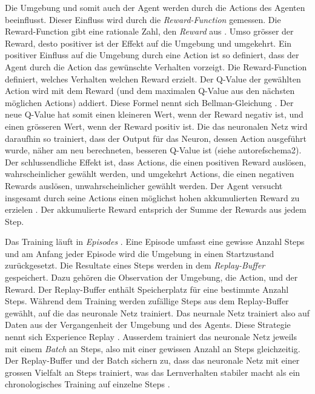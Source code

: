 Die Umgebung und somit auch der Agent werden durch die Actions des Agenten
beeinflusst. Dieser Einfluss wird durch die \emph{Reward-Function} gemessen. Die
Reward-Function gibt eine rationale Zahl, den \emph{Reward} aus \cite[S.
75]{sutton_reinforcement_2014}. Umso grösser der Reward, desto positiver ist der
Effekt auf die Umgebung und umgekehrt. Ein positiver Einfluss auf die Umgebung
durch eine Action ist so definiert, dass der Agent durch die Action das
gewünschte Verhalten vorzeigt. Die Reward-Function definiert, welches Verhalten
welchen Reward erzielt. Der Q-Value der gewählten Action wird mit dem Reward
(und dem maximalen Q-Value aus den nächsten möglichen Actions) addiert. Diese
Formel nennt sich Bellman-Gleichung \cite[S. 3]{mnih_playing_2013}. Der neue
Q-Value hat somit einen kleineren Wert, wenn der Reward negativ ist, und einen
grösseren Wert, wenn der Reward positiv ist. Die das neuronalen Netz wird
daraufhin so trainiert, dass der Output für das Neuron, dessen Action ausgeführt
wurde, näher am neu berechneten, besseren Q-Value ist (siehe autoref{schema2}).
Der schlussendliche Effekt ist, dass Actions, die einen positiven Reward
auslösen, wahrscheinlicher gewählt werden, und umgekehrt Actions, die einen
negativen Rewards auslösen, unwahrscheinlicher gewählt werden. Der Agent
versucht insgesamt durch seine Actions einen möglichst hohen akkumulierten
Reward zu erzielen \cite[S. 57]{sutton_reinforcement_2014}. Der akkumulierte
Reward entsprich der Summe der Rewards aus jedem Step.


Das Training läuft in \emph{Episodes} \cite[S. 14]{sutton_reinforcement_2014}. Eine Episode umfasst
eine gewisse Anzahl Steps und am Anfang jeder Episode wird die Umgebung in einen
Startzustand zurückgesetzt. Die Resultate eines Steps werden in dem
\emph{Replay-Buffer} gespeichert. Dazu gehören die Observation der Umgebung, die
Action, und der Reward. Der Replay-Buffer enthält Speicherplatz für eine
bestimmte Anzahl Steps. Während dem Training werden zufällige Steps aus dem
Replay-Buffer gewählt, auf die das neuronale Netz trainiert. Das neurnale Netz
trainiert also auf Daten aus der Vergangenheit der Umgebung und des Agents.
Diese Strategie nennt sich Experience Replay \cite[S. 5]{mnih_playing_2013}. Ausserdem trainiert
das neuronale Netz jeweils mit einem \emph{Batch} an Steps, also mit einer
gewissen Anzahl an Steps gleichzeitig. Der Replay-Buffer und der Batch sichern
zu, dass das neuronale Netz mit einer grossen Vielfalt an Steps trainiert, was
das Lernverhalten stabiler macht als ein chronologisches Training auf einzelne
Steps \cite{phd_how_2021}.


